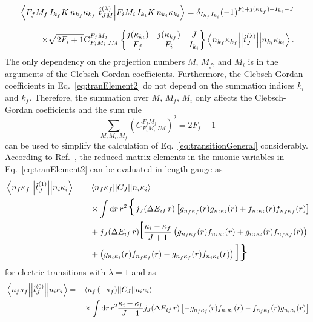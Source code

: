 \begin{alignat}{2}
\left<F_fM_f\,I_{k_f}K\,n_{k_f}\kappa_{k_f} \middle|\hat{t}^{(\lambda)}_{JM}\middle|F_iM_i\,I_{k_i}K\,n_{k_i}\kappa_{k_i}\right>=\delta_{I_{k_f}I_{k_i}}(-1)^{F_i+j(\kappa_{k_f})+I_{k_i}-J}
\notag\\[7.5pt]
\times\sqrt{2F_i+1}\text{C}^{F_fM_f}_{F_iM_i\,JM}
\begin{Bmatrix}
j(\kappa_{k_i})&j(\kappa_{k_f})&J\\
F_f&F_i&I_{k_i}
\end{Bmatrix}
\left< n_{k_f}\kappa_{k_f}\middle|\middle|\hat{t}^{(\lambda)}_{J}\middle|\middle|n_{k_i}\kappa_{k_i}\right>.
\label{eq:tranElement2}
\end{alignat}
The only dependency on the projection numbers $M$, $M_f$, and $M_i$ is in the arguments of the Clebsch-Gordan coefficients.
Furthermore, the Clebsch-Gordan coefficients in Eq.~\eqref{eq:tranElement2} do not depend on the summation indices $k_i$ and $k_f$.
Therefore, the summation over $M$, $M_f$, $M_i$ only affects the Clebsch-Gordan coefficients and the sum rule~\cite{varshalovich1988}
\begin{equation}
\sum_{M,M_i,M_f}\left(C^{F_fM_f}_{F_iM_i\,JM}\right)^2 = 2F_f+1
\end{equation}
can be used to simplify the calculation of Eq.~\eqref{eq:transitionGeneral} considerably. According to Ref.~\cite{johnson2007}, the reduced matrix elements in the muonic variables in Eq.~\eqref{eq:tranElement2} can be evaluated in length gauge as
\begin{alignat}{2}
\label{eq:relElTrans}
&\left< n_{f}\kappa_{f}\middle|\middle|\hat{t}^{(1)}_{J}\middle|\middle|n_{i}\kappa_{i}\right>=&&
\left<n_f\kappa_f\middle|\middle|C_J\middle|\middle|n_i\kappa_i\right>\\
&&&\times\int\text{d}r\,r^2 \text{\huge\{}j_J(\Delta E_{if}\,r)\left[g_{n_f\kappa_f}(r)g_{n_i\kappa_i}(r)+f_{n_i\kappa_i}(r)f_{n_f\kappa_f}(r)\right]\\
&&& +j_J(\Delta E_{if}\,r)\text{\huge[}\frac{\kappa_i-\kappa_f}{J+1}
\left(g_{n_f\kappa_f}(r)f_{n_i\kappa_i}(r)+g_{n_i\kappa_i}(r)f_{n_f\kappa_f}(r)\right)\\
&&& +\left(g_{n_i\kappa_i}(r)f_{n_f\kappa_f}(r)-g_{n_f\kappa_f}(r)f_{n_i\kappa_i}(r)\right)
 \text{\huge]}\text{\huge\}}
\end{alignat}
for electric transitions with $\lambda= 1 $ and as
\begin{alignat}{2}
\label{eq:relMagTrans}
&\left< n_{f}\kappa_{f}\middle|\middle|\hat{t}^{(0)}_{J}\middle|\middle|n_{i}\kappa_{i}\right>=&&
\left<n_f\,({-}{\kappa_f})\middle|\middle|C_J\middle|\middle|n_i\kappa_i\right>\notag\\
&&&\times\int\text{d}r\,r^2\frac{\kappa_i+\kappa_f}{J+1}j_J(\Delta E_{if}\,r)\left[-g_{n_f\kappa_f}(r)f_{n_i\kappa_i}(r)-f_{n_f\kappa_f}(r)g_{n_i\kappa_i}(r)\right]
\end{alignat}
